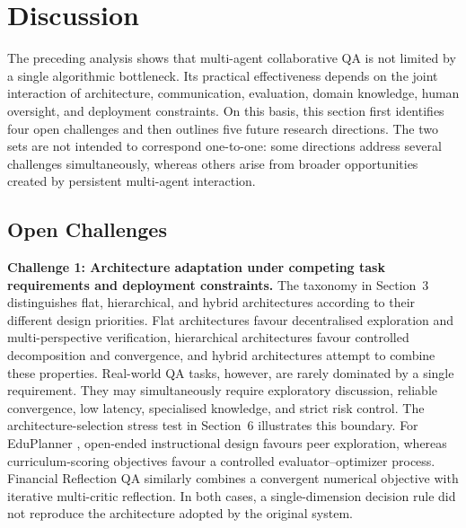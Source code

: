 \section{Discussion}
\label{sec:discussion}

The preceding analysis shows that multi-agent collaborative QA is not limited
by a single algorithmic bottleneck. Its practical effectiveness depends on the
joint interaction of architecture, communication, evaluation, domain
knowledge, human oversight, and deployment constraints. On this basis, this
section first identifies four open challenges and then outlines five future
research directions. The two sets are not intended to correspond one-to-one:
some directions address several challenges simultaneously, whereas others
arise from broader opportunities created by persistent multi-agent
interaction.

\subsection{Open Challenges}
\label{sec:open_challenges}

\textbf{Challenge 1: Architecture adaptation under competing task
requirements and deployment constraints.}
The taxonomy in Section~3 distinguishes flat, hierarchical, and hybrid
architectures according to their different design priorities. Flat
architectures favour decentralised exploration and multi-perspective
verification, hierarchical architectures favour controlled decomposition and
convergence, and hybrid architectures attempt to combine these properties.
Real-world QA tasks, however, are rarely dominated by a single requirement.
They may simultaneously require exploratory discussion, reliable convergence,
low latency, specialised knowledge, and strict risk control. The
architecture-selection stress test in Section~6 illustrates this boundary.
For EduPlanner \citep{zhang2024eduplanner}, open-ended instructional design
favours peer exploration, whereas curriculum-scoring objectives favour a
controlled evaluator--optimizer process. Financial Reflection QA
\citep{fatemi2024financialqa} similarly combines a convergent numerical
objective with iterative multi-critic reflection. In both cases, a
single-dimension decision rule did not reproduce the architecture adopted by
the original system.

